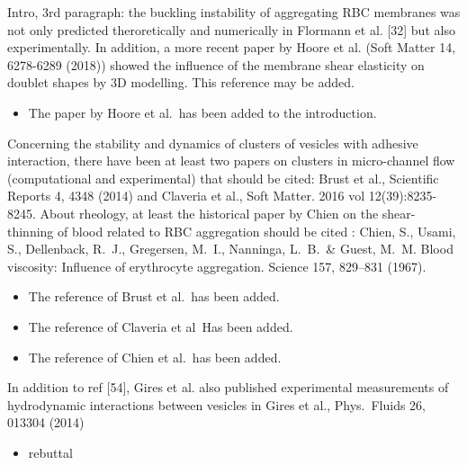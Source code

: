 \documentclass[11pt]{article}
\newcommand{\comment}[1]{{\color{blue} #1}}
\begin{document}
\noindent
\comment{Intro, 3rd paragraph: the buckling instability of aggregating RBC
membranes was not only predicted theroretically and numerically in
Flormann et al. [32] but also experimentally. In addition, a more
recent paper by Hoore et al. (Soft Matter 14, 6278-6289 (2018)) showed
the influence of the membrane shear elasticity on doublet shapes by 3D
modelling. This reference may be added.}
\begin{itemize}
  \item The paper by Hoore et al.~has been added to the introduction.
\end{itemize}

\noindent
\comment{Concerning the stability and dynamics of clusters of vesicles with
adhesive interaction, there have been at least two papers on clusters
in micro-channel flow (computational and experimental) that should be
cited: Brust et al., Scientific Reports 4, 4348 (2014) and Claveria et
al., Soft Matter. 2016 vol 12(39):8235-8245. About rheology, at least
the historical paper by Chien on the shear-thinning of blood related
to RBC aggregation should be cited : Chien, S., Usami, S., Dellenback,
R.~J., Gregersen, M.~I., Nanninga, L.~B.~\& Guest, M.~M. Blood
viscosity: Influence of erythrocyte aggregation. Science 157, 829–831
(1967).}
\begin{itemize}
  \item The reference of Brust et al.~has been added.
  \item The reference of Claveria et al~Has been added.
  \item The reference of Chien et al.~has been added.
\end{itemize}

\noindent
\comment{In addition to ref [54], Gires et al. also published experimental
measurements of hydrodynamic interactions between vesicles in Gires et
al., Phys.~Fluids 26, 013304 (2014)}
\begin{itemize}
  \item rebuttal
\end{itemize}
\end{document}
